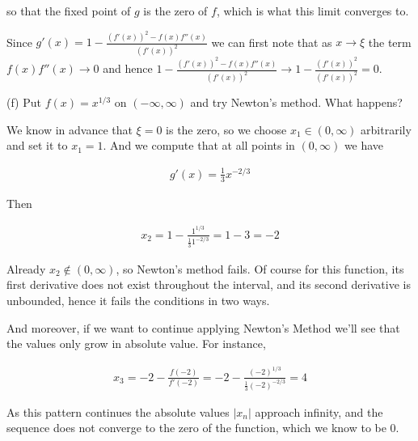 \documentclass{article}
\begin{document}
  so that the fixed point of $g$ is the zero of $f$, which is what this limit converges to.

  \vspace{1cm}

  Since $g'(x)=1-\frac{(f'(x))^2-f(x)f''(x)}{(f'(x))^2}$ we can first note that as $x\to \xi$ the term $f(x)f''(x)\to 0$ and hence $1-\frac{(f'(x))^2-f(x)f''(x)}{(f'(x))^2}\to 1-\frac{(f'(x))^2}{(f'(x))^2} = 0$.

  \vspace{1cm}

  {\Large \color{Sepia} (f) Put $f(x)=x^{1/3}$ on $(-\infty,\infty)$ and try Newton's method.  What happens?}

  \vspace{1cm}

  We know in advance that $\xi=0$ is the zero, so we choose $x_1\in(0,\infty)$ arbitrarily and set it to $x_1=1$.  And we compute that at all points in $(0,\infty)$ we have

  \begin{align*}
    g'(x)=\frac 1 3 x^{-2/3}
  \end{align*}

  Then

  \begin{align*}
    x_2=1-\frac{1^{1/3}}{\frac 1 3 1^{-2/3}} = 1-3=-2
  \end{align*}

  Already $x_2\not\in (0,\infty)$, so Newton's method fails.  Of course for this function, its first derivative does not exist throughout the interval, and its second derivative is unbounded, hence it fails the conditions in two ways.

  And moreover, if we want to continue applying Newton's Method we'll see that the values only grow in absolute value.  For instance,

  \begin{align*}
    x_3 = -2-\frac{f(-2)}{f'(-2)} = -2 -\frac{(-2)^{1/3}}{\frac 1 3 (-2)^{-2/3}} = 4
  \end{align*}

  As this pattern continues the absolute values $|x_n|$ approach infinity, and the sequence does not converge to the zero of the function, which we know to be 0.

  \pagebreak
\end{document}

